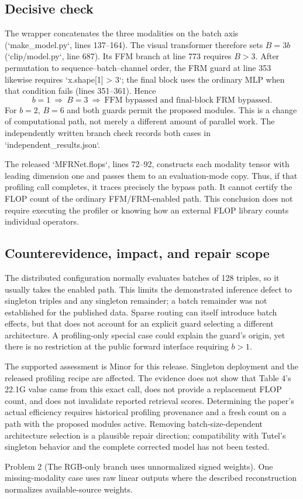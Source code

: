 \documentclass[10pt]{article}
\begin{document}
\subsection*{Decisive check}
The wrapper concatenates the three modalities on the batch axis (`make\_model.py`, lines 137–164). The visual transformer therefore sets \(B=3b\) (`clip/model.py`, line 687). Its FFM branch at line 773 requires \(B>3\). After permutation to sequence–batch–channel order, the FRM guard at line 353 likewise requires `x.shape[1] > 3`; the final block uses the ordinary MLP when that condition fails (lines 351–361). Hence \[b=1\ \Longrightarrow\ B=3\ \Longrightarrow\
  \text{FFM bypassed and final-block FRM bypassed}.\] For \(b=2\), \(B=6\) and both guards permit the proposed modules. This is a change of computational path, not merely a different amount of parallel work. The independently written branch check records both cases in `independent\_results.json`.\par
The released `MFRNet.flops`, lines 72–92, constructs each modality tensor with leading dimension one and passes them to an evaluation-mode copy. Thus, if that profiling call completes, it traces precisely the bypass path. It cannot certify the FLOP count of the ordinary FFM/FRM-enabled path. This conclusion does not require executing the profiler or knowing how an external FLOP library counts individual operators.\par
\subsection*{Counterevidence, impact, and repair scope}
The distributed configuration normally evaluates batches of 128 triples, so it usually takes the enabled path. This limits the demonstrated inference defect to singleton triples and any singleton remainder; a batch remainder was not established for the published data. Sparse routing can itself introduce batch effects, but that does not account for an explicit guard selecting a different architecture. A profiling-only special case could explain the guard’s origin, yet there is no restriction at the public forward interface requiring \(b>1\).\par
The supported assessment is Minor for this release. Singleton deployment and the released profiling recipe are affected. The evidence does not show that Table 4’s 22.1G value came from this exact call, does not provide a replacement FLOP count, and does not invalidate reported retrieval scores. Determining the paper’s actual efficiency requires historical profiling provenance and a fresh count on a path with the proposed modules active. Removing batch-size-dependent architecture selection is a plausible repair direction; compatibility with Tutel’s singleton behavior and the complete corrected model has not been tested.\par
Problem 2 (The RGB-only branch uses unnormalized signed weights).  One missing-modality case uses raw linear outputs where the described reconstruction normalizes available-source weights.\par
\end{document}

